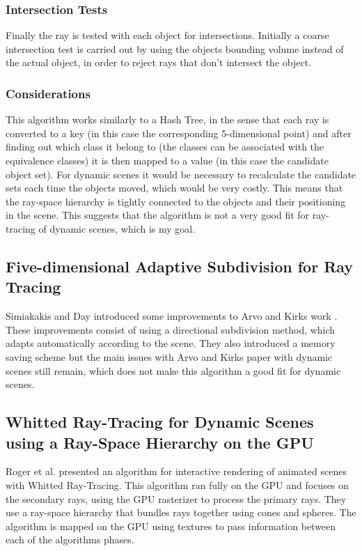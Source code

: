 \documentclass{llncs}
\begin{document}
\subsubsection{Intersection Tests}	

Finally the ray is tested with each object for intersections. Initially a coarse intersection test is carried out by using the objects bounding volume instead of the actual object, in order to reject rays that don't intersect the object.

\subsubsection{Considerations}

This algorithm works similarly to a Hash Tree, in the sense that each ray is converted to a key (in this case the corresponding 5-dimensional point) and after finding out which class it belong to (the classes can be associated with the equivalence classes) it is then mapped to a value (in this case the candidate object set). For dynamic scenes it would be necessary to recalculate the candidate sets each time the objects moved, which would be very costly. This means that the ray-space hierarchy is tightly connected to the objects and their positioning in the scene. This suggests that the algorithm is not a very good fit for ray-tracing of dynamic scenes, which is my goal.

%
\subsection{Five-dimensional Adaptive Subdivision for Ray Tracing}
%

Simiakakis and Day \cite{SimiakisDay94} introduced some improvements to Arvo and Kirks work \cite{ArvoKirk87}. These improvements consist of using a directional subdivision method, which adapts automatically according to the scene. They also introduced a memory saving scheme but the main issues with Arvo and Kirks paper with dynamic scenes still remain, which does not make this algorithm a good fit for dynamic scenes.

%
\subsection{Whitted Ray-Tracing for Dynamic Scenes using a Ray-Space Hierarchy on the GPU}
%

Roger et al. \cite{Roger07} presented an algorithm for interactive rendering of animated scenes with Whitted Ray-Tracing. This algorithm ran fully on the GPU and focuses on the secondary rays, using the GPU rasterizer to process the primary rays. They use a ray-space hierarchy that bundles rays together using cones and spheres. The algorithm is mapped on the GPU using textures to pass information between each of the algorithms phases.
\end{document}
